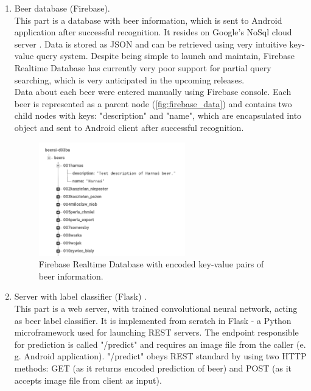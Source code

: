 \documentclass[11pt, a4paper]{article}
\begin{document}
\begin{enumerate}[1)]
\item Beer database (Firebase).\\
This part is a database with beer information, which is sent to Android application after successful recognition. It resides on Google's NoSql cloud server \cite{nosql_def}. Data is stored as JSON and can be retrieved using very intuitive key-value query system. Despite being simple to launch and maintain, Firebase Realtime Database has currently very poor support for partial query searching, which is very anticipated in the upcoming releases.\\

Data about each beer were entered manually using Firebase console. Each beer is represented as a parent node (\autoref{fig:firebase_data}) and contains two child nodes with keys: "description" and "name", which are encapsulated into object and sent to Android client after successful recognition.

\begin{figure}[h]
\includegraphics[width=0.6\textwidth]{firebase_data}
\centering
\caption[Firebase Realtime Database - baza danych w chmurze]{Firebase Realtime Database with encoded key-value pairs of beer information.}
\label{fig:firebase_data}
\end{figure}

\item Server with label classifier (Flask) \cite{flask_server_repo}. \\
This part is a web server, with trained convolutional neural network, acting as beer label classifier. It is implemented from scratch in Flask - a Python microframework used for launching REST \cite{rest_def} servers. The endpoint responsible for prediction is called "/predict" and requires an image file from the caller (e. g. Android application). "/predict" obeys REST standard by using two HTTP methods: GET (as it returns encoded prediction of beer) and POST (as it accepts image file from client as input).


\end{enumerate}
\end{document}

